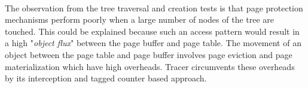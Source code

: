 \paragraph{}
The observation from the tree traversal and creation tests is that page protection mechanisms perform poorly when a large number of nodes of the tree are touched. This could be explained because such an access pattern would result in a high "{\emph{object flux}}" between the page buffer and page table. The movement of an object between the page table and page buffer involves page eviction and page materialization which have high overheads. Tracer circumvents these overheads by its interception and tagged counter based approach. 